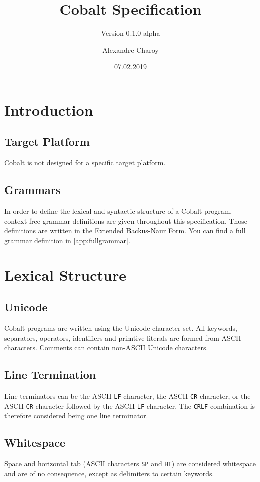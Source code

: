 \documentclass[a4paper,appendixprefix]{scrreprt}
\title{Cobalt Specification}
\subtitle{Version 0.1.0-alpha}
\author{Alexandre Charoy}
\date{07.02.2019}
\begin{document}
\maketitle

\chapter{Introduction}

\section{Target Platform}
Cobalt is not designed for a specific target platform.

\section{Grammars}
In order to define the lexical and syntactic structure of a Cobalt program, context-free grammar definitions are given throughout this specification. Those definitions are written in the \href{https://en.wikipedia.org/wiki/Extended_Backus-Naur_form}{Extended Backus-Naur Form}. You can find a full grammar definition in \ref{app:fullgrammar}.

\chapter{Lexical Structure}

\section{Unicode}
Cobalt programs are written using the Unicode character set. All keywords, separators, operators, identifiers and primtive literals are formed from ASCII characters. Comments can contain non-ASCII Unicode characters.

\section{Line Termination}\label{line_termination}
Line terminators can be the ASCII \verb!LF! character, the ASCII \verb!CR! character, or the ASCII \verb!CR! character followed by the ASCII \verb!LF! character. The \verb!CRLF! combination is therefore considered being one line terminator.

\section{Whitespace}
Space and horizontal tab (ASCII characters \verb!SP! and \verb!HT!) are considered whitespace and are of no consequence, except as delimiters to certain keywords.
\end{document}

